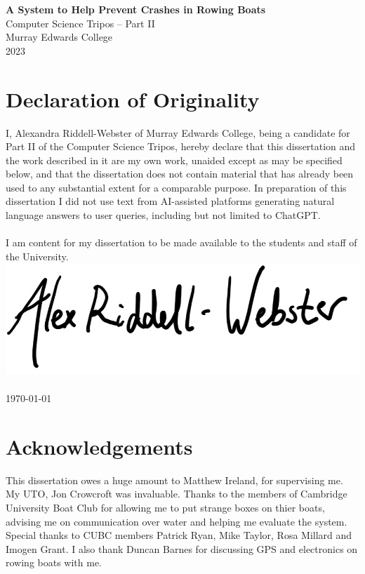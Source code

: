 \documentclass[12pt,a4paper]{report}
\begin{document}
\thispagestyle{empty}


\vspace*{60mm}
\begin{center}
\Huge
\textbf{A System to Help Prevent Crashes in Rowing Boats} \\[5mm]
Computer Science Tripos -- Part II \\[5mm]
Murray Edwards College \\[5mm]
2023
\end{center}

\pagestyle{plain}
\chapter*{Declaration of Originality}

I, Alexandra Riddell-Webster of Murray Edwards College, being a candidate for Part II of the Computer Science Tripos, hereby declare that this dissertation and the work described in it are my own work, unaided except as may be specified below, and that the dissertation does not contain material that has already been used to any substantial extent for a comparable purpose. In preparation of this dissertation I did not use text from AI-assisted platforms generating natural language answers to user queries, including but not limited to ChatGPT.\\ \\
I am content for my dissertation to be made available to the students and staff of the University. \\

\bigskip
{}
\includegraphics[scale=0.35]{sig.jpg} \\
 \\ 
\today

\chapter*{Acknowledgements}
This dissertation owes a huge amount to Matthew Ireland, for supervising me. My UTO, Jon Crowcroft was invaluable. Thanks to the members of Cambridge University Boat Club for allowing me to put strange boxes on thier boats, advising me on communication over water and helping me evaluate the system. Special thanks to CUBC members Patrick Ryan, Mike Taylor, Rosa Millard and Imogen Grant. I also thank Duncan Barnes for discussing GPS and electronics on rowing boats with me.
\end{document}
